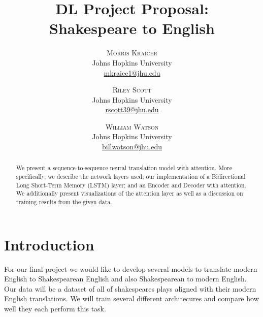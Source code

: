 \documentclass[twoside,twocolumn]{article}
\title{DL Project Proposal:\\Shakespeare to English}
\author{%
\textsc{Morris Kraicer} \\[1ex]
\normalsize Johns Hopkins University \\
\normalsize \href{mailto:mkraice1@jhu.edu}{mkraice1@jhu.edu}
 \and
 \textsc{Riley Scott} \\[1ex]
\normalsize Johns Hopkins University \\
\normalsize \href{mailto:rscott39@jhu.edu}{rscott39@jhu.edu}
 \and
  \textsc{William Watson} \\[1ex]
\normalsize Johns Hopkins University \\
\normalsize \href{mailto:billwatson@jhu.edu}{billwatson@jhu.edu}
}
\date{}%
\begin{document}
\maketitle













\begin{abstract}
\noindent
We present a sequence-to-sequence neural translation model with attention. More specifically, we describe the network layers used; our implementation of a Bidirectional Long Short-Term Memory (LSTM) layer; and an Encoder and Decoder with attention. We additionally present visualizations of the attention layer as well as a discussion on training results from the given data.
\end{abstract}

\section{Introduction}
For our final project we would like to develop several models to translate modern English to Shakespearean English and also Shakespearean to modern English. Our data will be a dataset of all of shakespeares plays aligned with their modern English translations. We will train several different architecures and compare how well they each perform this task. 
\end{document}
